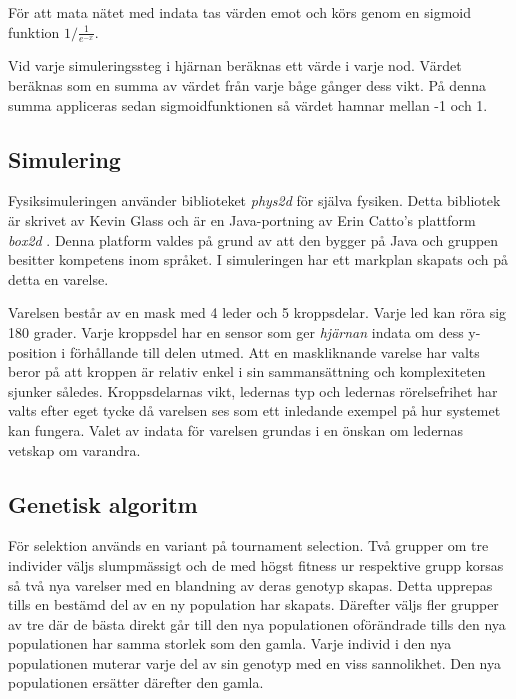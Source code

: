 \documentclass[titlepage, twocolumn, a4paper, 12pt]{article}
\begin{document}
För att mata nätet med indata tas värden emot och körs genom en sigmoid funktion $1/\frac{1}{e^{-x}}$.

Vid varje simuleringssteg i hjärnan beräknas ett värde i varje nod. Värdet beräknas som en summa av värdet från varje båge gånger dess vikt. På denna summa appliceras sedan sigmoidfunktionen så värdet hamnar mellan -1 och 1. 


\subsection{Simulering}
Fysiksimuleringen använder biblioteket \textit{phys2d} \cite{phys2d} för själva fysiken. Detta bibliotek är skrivet av Kevin Glass och är en Java-portning av Erin Catto's plattform \textit{box2d} \cite{box2d}. Denna platform valdes på grund av att den bygger på Java och gruppen besitter kompetens inom språket. I simuleringen har ett markplan skapats och på detta en varelse. 

Varelsen består av en mask med 4 leder och 5 kroppsdelar. Varje led kan röra sig 180 grader. Varje kroppsdel har en sensor som ger \textit{hjärnan} indata om dess y-position i förhållande till delen utmed. Att en maskliknande varelse har valts beror på att kroppen är relativ enkel i sin sammansättning och komplexiteten sjunker således. Kroppsdelarnas vikt, ledernas typ och ledernas rörelsefrihet har valts efter eget tycke då varelsen ses som ett inledande exempel på hur systemet kan fungera. Valet av indata för varelsen grundas i en önskan om ledernas vetskap om varandra.


\subsection{Genetisk algoritm}
För selektion används en variant på tournament selection. Två grupper om tre individer väljs slumpmässigt och de med högst fitness ur respektive grupp korsas så två nya varelser med en blandning av deras genotyp skapas. Detta upprepas tills en bestämd del av en ny population har skapats. Därefter väljs fler grupper av tre där de bästa direkt går till den nya populationen oförändrade tills den nya populationen har samma storlek som den gamla. Varje individ i den nya populationen muterar varje del av sin genotyp med en viss sannolikhet. Den nya populationen ersätter därefter den gamla. 
		
\end{document}
